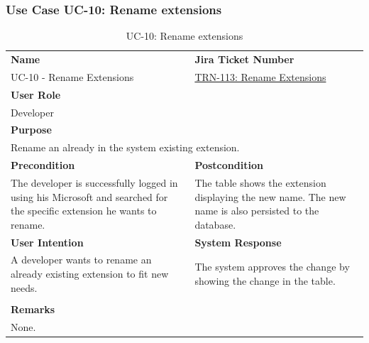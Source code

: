 \subsubsection{Use Case UC-10: Rename extensions}\label{subsubsec:use-case-uc-10:-rename-extensions}

\begin{table}[H]
    \centering
    \begin{tabular}{|p{}|p{}|}

        \hline
        \rowcolor{gray!50}\textbf{Name} & \rowcolor{gray!50}\textbf{Jira Ticket Number} \\
        UC-10 - Rename Extensions
        &
        \href{https://fh-burgenland.atlassian.net/browse/TRN-113}{TRN-113: Rename Extensions} \\ \hline

        \multicolumn{2}{|l|}{\rowcolor{gray!50}\textbf{User Role}} \\
        \multicolumn{2}{|l|}{Developer} \\ \hline

        \multicolumn{2}{|l|}{\rowcolor{gray!50}\textbf{Purpose}} \\
        \multicolumn{2}{|p{1\textwidth}|}{Rename an already in the system existing extension.} \\ \hline

        \rowcolor{gray!50}\textbf{Precondition} & \rowcolor{gray!50}\textbf{Postcondition} \\
        The developer is successfully logged in using his Microsoft and searched for the specific extension he wants to rename.
        &
        The table shows the extension displaying the new name.
        The new name is also persisted to the database.\\ \hline

        \rowcolor{gray!50}\textbf{User Intention} & \rowcolor{gray!50}\textbf{System Response} \\
        A developer wants to rename an already existing extension to fit new needs.
        &
        The system approves the change by showing the change in the table. \\ \hline

        & \\ \hline

        \multicolumn{2}{|l|}{\rowcolor{gray!50}\textbf{Remarks}} \\
        \multicolumn{2}{|p{1\textwidth}|}{None.} \\ \hline
    \end{tabular}
    \caption{UC-10: Rename extensions}
    \label{tab:uc-rename-extensions}
\end{table}


